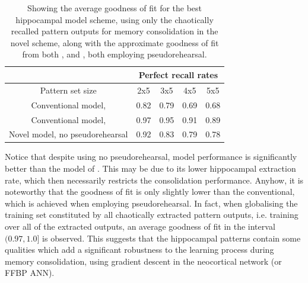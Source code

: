 \begin{table}[]
\centering
\caption{Showing the average goodness of fit for the best hippocampal model scheme, using only the chaotically recalled pattern outputs for memory consolidation in the novel scheme, along with the approximate goodness of fit from both \citep{Hattori2014}, and \citep{Hattori2010}, both employing pseudorehearsal.}
\label{table:comparison-goodness-of-fit}
\begin{tabular}{c|c|c|c|c|}
\cline{2-5}
                                                      & \multicolumn{4}{c|}{Perfect recall rates} \\ \hline
\multicolumn{1}{|c|}{Pattern set size}                & 2x5      & 3x5      & 4x5      & 5x5      \\ \hline
\multicolumn{1}{|c|}{Conventional model, \citep{Hattori2010}}              & 0.82     & 0.79     & 0.69     & 0.68     \\ \hline
\multicolumn{1}{|c|}{Conventional model, \citep{Hattori2014}}              & 0.97     & 0.95     & 0.91     & 0.89     \\ \hline
\multicolumn{1}{|c|}{Novel model, no pseudorehearsal} & 0.92     & 0.83     & 0.79     & 0.78     \\ \hline
\end{tabular}
\end{table}

Notice that despite using no pseudorehearsal, model performance is significantly better than the model of \citep{Hattori2010}. This may be due to its lower hippocampal extraction rate, which then necessarily restricts the consolidation performance. Anyhow, it is noteworthy that the goodness of fit is only slightly lower than the conventional, which is achieved when employing pseudorehearsal. In fact, when globalising the training set constituted by all chaotically extracted pattern outputs, i.e. training over all of the extracted outputs, an average goodness of fit in the interval $(0.97, 1.0]$ is observed. This suggests that the hippocampal patterns contain some qualities which add a significant robustness to the learning process during memory consolidation, using gradient descent in the neocortical network (or FFBP ANN). 

